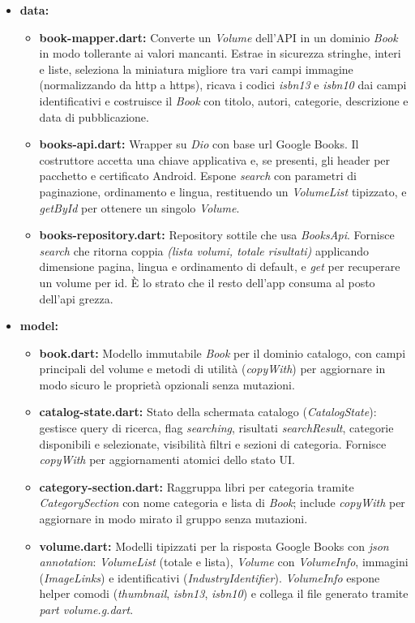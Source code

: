 \documentclass{article}
\begin{document}
\begin{itemize}
\begin{itemize}
    \item \textbf{data:}
    \begin{itemize}
      \item \textbf{book-mapper.dart:} Converte un \textit{Volume} dell’API in un dominio \textit{Book} in modo tollerante ai valori mancanti. Estrae in sicurezza stringhe, interi e liste, seleziona la miniatura migliore tra vari campi immagine (normalizzando da http a https), ricava i codici \textit{isbn13} e \textit{isbn10} dai campi identificativi e costruisce il \textit{Book} con titolo, autori, categorie, descrizione e data di pubblicazione.
      \item \textbf{books-api.dart:} Wrapper su \textit{Dio} con base url Google Books. Il costruttore accetta una chiave applicativa e, se presenti, gli header per pacchetto e certificato Android. Espone \textit{search} con parametri di paginazione, ordinamento e lingua, restituendo un \textit{VolumeList} tipizzato, e \textit{getById} per ottenere un singolo \textit{Volume}.
      \item \textbf{books-repository.dart:} Repository sottile che usa \textit{BooksApi}. Fornisce \textit{search} che ritorna coppia \textit{(lista volumi, totale risultati)} applicando dimensione pagina, lingua e ordinamento di default, e \textit{get} per recuperare un volume per id. È lo strato che il resto dell’app consuma al posto dell’api grezza.
    \end{itemize}
    \item \textbf{model:}
    \begin{itemize}
      \item \textbf{book.dart:} Modello immutabile \textit{Book} per il dominio catalogo, con campi principali del volume e metodi di utilità (\textit{copyWith}) per aggiornare in modo sicuro le proprietà opzionali senza mutazioni.
      \item \textbf{catalog-state.dart:} Stato della schermata catalogo (\textit{CatalogState}): gestisce query di ricerca, flag \textit{searching}, risultati \textit{searchResult}, categorie disponibili e selezionate, visibilità filtri e sezioni di categoria. Fornisce \textit{copyWith} per aggiornamenti atomici dello stato UI.
      \item \textbf{category-section.dart:} Raggruppa libri per categoria tramite \textit{CategorySection} con nome categoria e lista di \textit{Book}; include \textit{copyWith} per aggiornare in modo mirato il gruppo senza mutazioni.
      \item \textbf{volume.dart:} Modelli tipizzati per la risposta Google Books con \textit{json annotation}: \textit{VolumeList} (totale e lista), \textit{Volume} con \textit{VolumeInfo}, immagini (\textit{ImageLinks}) e identificativi (\textit{IndustryIdentifier}). \textit{VolumeInfo} espone helper comodi (\textit{thumbnail}, \textit{isbn13}, \textit{isbn10}) e collega il file generato tramite \textit{part volume.g.dart}.

\end{itemize}
\end{itemize}
\end{itemize}
\end{document}
